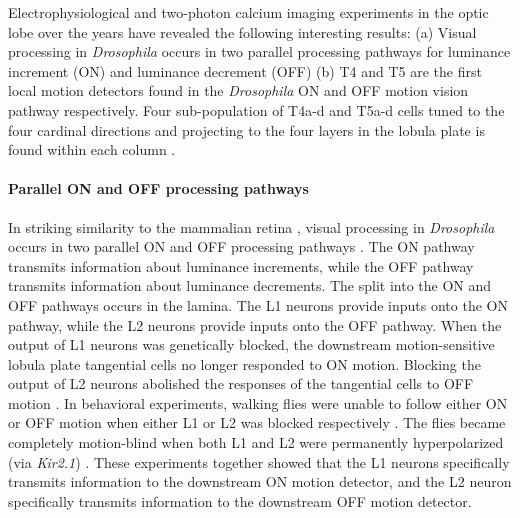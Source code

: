 Electrophysiological and two-photon calcium imaging experiments in the optic lobe over the years have revealed the following interesting results: (a) Visual processing in \textit{Drosophila} occurs in two parallel processing pathways for luminance increment (ON) and luminance decrement (OFF) \parencite{Joesch2010, Joesch2013, Strother2014, Eichner2011, Behnia2014, Shinomiya2014} (b) T4 and T5 are the first local motion detectors found in the \textit{Drosophila} ON and OFF motion vision pathway respectively. Four sub-population of T4a-d and T5a-d cells tuned to the four cardinal directions and projecting to the four layers in the lobula plate is found within each column \parencite{Maisak2013}. 


\paragraph{Parallel ON and OFF processing pathways}
In striking similarity to the mammalian retina \parencite{Masland2012}, visual processing in \textit{Drosophila} occurs in two parallel ON and OFF processing pathways \parencite{Borst2015}. The ON pathway transmits information about luminance increments, while the OFF pathway transmits information about luminance decrements. The split into the ON and OFF pathways occurs in the lamina. The L1 neurons provide inputs onto the ON pathway, while the L2 neurons provide inputs onto the OFF pathway. When the output of L1 neurons was genetically blocked, the downstream motion-sensitive lobula plate tangential cells no longer responded to ON motion. Blocking the output of L2 neurons abolished the responses of the tangential cells to OFF motion \parencite{Joesch2010}. In behavioral experiments, walking flies were unable to follow either ON or OFF motion when either L1 or L2 was blocked respectively \parencite{Clark2011, Maisak2013}. The flies became completely motion-blind when both L1 and L2 were permanently hyperpolarized (via \textit{Kir2.1}) \parencite{Tuthill2013, Bahl2013}. These experiments together showed that the L1 neurons specifically transmits information to the downstream ON motion detector, and the L2 neuron specifically transmits information to the downstream OFF motion detector. 

